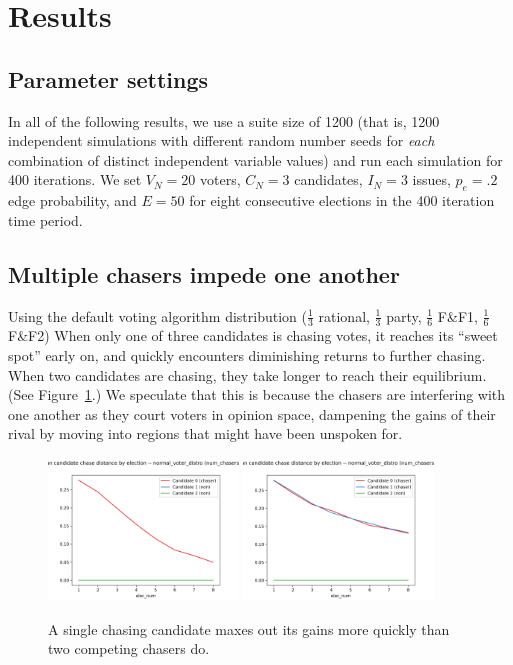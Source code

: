 \section{Results}
\label{sec:results}

\subsection{Parameter settings}

In all of the following results, we use a suite size of 1200 (that is, 1200
independent simulations with different random number seeds for \textit{each}
combination of distinct independent variable values) and run each simulation
for 400 iterations. We set $V_N=20$ voters, $C_N=3$ candidates, $I_N=3$ issues,
$p_e=.2$ edge probability, and $E=50$ for eight consecutive elections in the
400 iteration time period.

\subsection{Multiple chasers impede one another}

Using the default voting algorithm distribution ($\frac{1}{3}$ rational,
$\frac{1}{3}$ party, $\frac{1}{6}$ F\&F1, $\frac{1}{6}$ F\&F2)
When only one of three candidates is chasing votes, it reaches its ``sweet
spot'' early on, and quickly encounters diminishing returns to further chasing.
When two candidates are chasing, they take longer to reach their equilibrium.
(See Figure~\ref{one_vs_two_chasers}.) We speculate that this is because the
chasers are interfering with one another as they court voters in opinion space,
dampening the gains of their rival by moving into regions that might have been
unspoken for.

\begin{figure}[ht]
\centering
\includegraphics[width=0.45\textwidth]{assets/one_chaser_maxes_out_soon.png}
\includegraphics[width=0.45\textwidth]{assets/two_chasers_max_out_later.png}
\caption{A single chasing candidate maxes out its gains more quickly than two
competing chasers do.}
\label{one_vs_two_chasers}
\end{figure}

